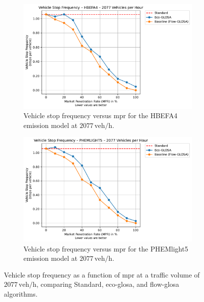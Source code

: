 \begin{figure}[htb]
  \centering
  \begin{subfigure}[b]{0.45\textwidth}
    \includegraphics[width=\textwidth]{data/img/VehicleStopFrequency/VehicleStopFrequency_HBEFA4_Cars2077.pdf}
    \caption{Vehicle stop frequency versus \ac{mpr} for the HBEFA4 emission model at $2077\,\mathrm{veh/h}$.}
  \end{subfigure}\hfill
  \begin{subfigure}[b]{0.45\textwidth}
    \includegraphics[width=\textwidth]{data/img/VehicleStopFrequency/VehicleStopFrequency_PHEMLIGHT5_Cars2077.pdf}
    \caption{Vehicle stop frequency versus \ac{mpr} for the PHEMlight5 emission model at $2077\,\mathrm{veh/h}$.}
  \end{subfigure}
  \caption{Vehicle stop frequency as a function of \ac{mpr} at a traffic volume of $2077\,\mathrm{veh/h}$, comparing Standard, \ac{eco-glosa}, and \ac{flow-glosa} algorithms.}
  \label{fig:StopFreq_2077}
\end{figure}

